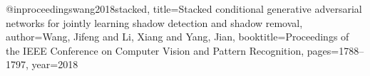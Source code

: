 @inproceedings{wang2018stacked,
  title={Stacked conditional generative adversarial networks for jointly learning shadow detection and shadow removal},
  author={Wang, Jifeng and Li, Xiang and Yang, Jian},
  booktitle={Proceedings of the IEEE Conference on Computer Vision and Pattern Recognition},
  pages={1788--1797},
  year={2018}
}